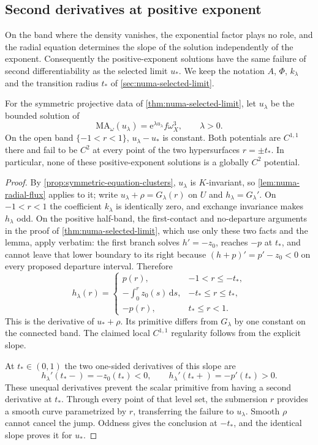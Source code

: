 \subsection{Second derivatives at positive exponent}
\label{sec:numa-positive-exponent-regularity}

On the band where the density vanishes, the exponential factor plays no role, and the radial equation determines the slope of the solution independently of the exponent. Consequently the positive-exponent solutions have the same failure of second differentiability as the selected limit $u_*$. We keep the notation $A$, $\Phi$, $k_\lambda$ and the transition radius $t_*$ of \cref{sec:numa-selected-limit}.

\begin{proposition}\label{prop:numa-positive-exponent-nonc2}
For the symmetric projective data of \cref{thm:numa-selected-limit}, let $u_\lambda$ be the bounded solution of
\[
 \mathrm{MA}_\omega(u_\lambda)
       =\mathrm{e}^{\lambda u_\lambda}f\omega_X^3,
 \qquad\lambda>0.
\]
On the open band $\{-1<r<1\}$, $u_\lambda-u_*$ is constant. Both potentials are $C^{1,1}$ there and fail to be $C^2$ at every point of the two hypersurfaces $r=\pm t_*$. In particular, none of these positive-exponent solutions is a globally $C^2$ potential.
\end{proposition}
\begin{proof}
By \cref{prop:symmetric-equation-clusters}, $u_\lambda$ is $K$-invariant, so \cref{lem:numa-radial-flux} applies to it; write $u_\lambda+\rho=G_\lambda(r)$ on $U$ and $h_\lambda=G_\lambda'$. On $-1<r<1$ the coefficient $k_\lambda$ is identically zero, and exchange invariance makes $h_\lambda$ odd. On the positive half-band, the first-contact and no-departure arguments in the proof of \cref{thm:numa-selected-limit}, which use only these two facts and the lemma, apply verbatim: the first branch solves $h'=-z_0$, reaches $-p$ at $t_*$, and cannot leave that lower boundary to its right because $(h+p)'=p'-z_0<0$ on every proposed departure interval. Therefore
\[
 h_\lambda(r)=
 \begin{cases}
  p(r),&-1<r\leq-t_*,\\
  -\displaystyle\int_0^r z_0(s)\,\mathrm{d}s,&-t_*\leq r\leq t_*,\\
  -p(r),&t_*\leq r<1.
 \end{cases}
\]
This is the derivative of $u_*+\rho$. Its primitive differs from $G_\lambda$ by one constant on the connected band. The claimed local $C^{1,1}$ regularity follows from the explicit slope.

At $t_*\in(0,1)$ the two one-sided derivatives of this slope are
\[
 h_\lambda'(t_*-)=-z_0(t_*)<0,
 \qquad
 h_\lambda'(t_*+)=-p'(t_*)>0.
\]
These unequal derivatives prevent the scalar primitive from having a second derivative at $t_*$. Through every point of that level set, the submersion $r$ provides a smooth curve parametrized by $r$, transferring the failure to $u_\lambda$. Smooth $\rho$ cannot cancel the jump. Oddness gives the conclusion at $-t_*$, and the identical slope proves it for $u_*$.
\end{proof}

